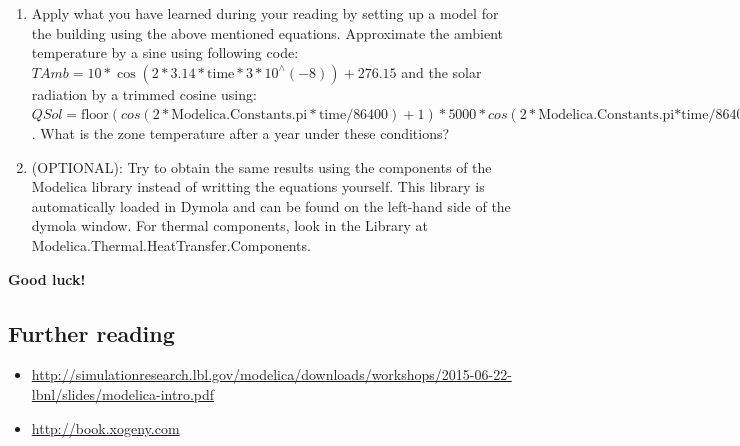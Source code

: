 \documentclass[10pt,a4paper]{article}
\begin{document}
\begin{enumerate}
\item Apply what you have learned during your reading by setting up a model for the building using the above mentioned equations. Approximate the ambient temperature by a sine using following code: $TAmb = 10*\cos(2*3.14*\text{time}*3*10^\wedge(-8)) + 276.15$ and the solar radiation by a trimmed cosine using: $QSol = \text{floor}(cos(2*\text{Modelica.Constants.pi}*\text{time} / 86400) + 1) * 5000 * cos(2*\text{Modelica.Constants.pi*time} / 86400)$. What is the zone temperature after a year under these conditions?
\item (OPTIONAL): Try to obtain the same results using the components of the Modelica library instead of writting the equations yourself. This library is automatically loaded in Dymola and can be found on the left-hand side of the dymola window. For thermal components, look in the Library at Modelica.Thermal.HeatTransfer.Components.   \linebreak[10]
\end{enumerate}

\begin{center}
 \textbf{Good luck!}
\end{center}

\subsection*{Further reading}
\begin{itemize}
	\item \url{http://simulationresearch.lbl.gov/modelica/downloads/workshops/2015-06-22-lbnl/slides/modelica-intro.pdf}
	\item \url{http://book.xogeny.com}
\end{itemize}
\end{document}
